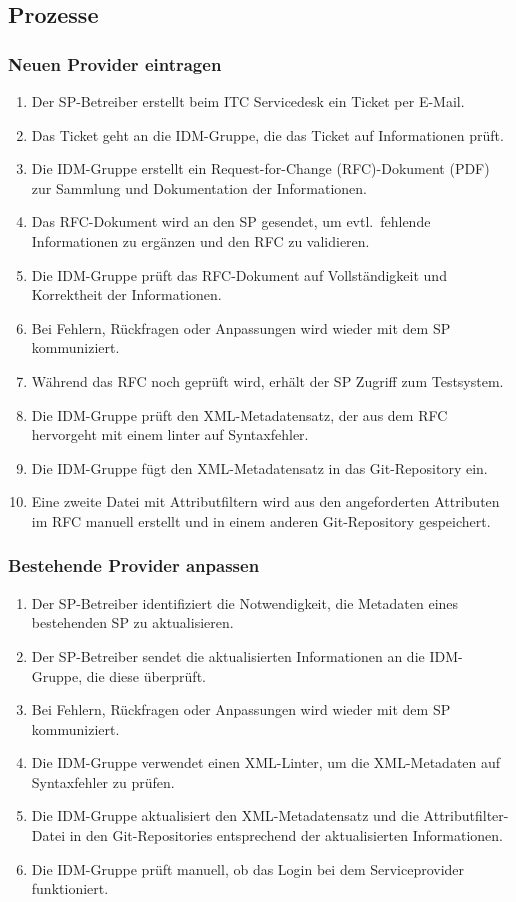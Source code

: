 \documentclass[a4paper, fontsize=11pt]{scrartcl}
\begin{document}
\subsection{Prozesse}

\subsubsection{Neuen Provider eintragen}

\begin{enumerate}
  \item Der SP-Betreiber erstellt beim ITC Servicedesk ein Ticket per E-Mail.
  \item Das Ticket geht an die IDM-Gruppe, die das Ticket auf Informationen prüft.
  \item Die IDM-Gruppe erstellt ein Request-for-Change (RFC)-Dokument (PDF) zur Sammlung und Dokumentation der Informationen.
  \item Das RFC-Dokument wird an den SP gesendet, um evtl.\ fehlende Informationen zu ergänzen und den RFC zu validieren.
  \item Die IDM-Gruppe prüft das RFC-Dokument auf Vollständigkeit und Korrektheit der Informationen.
  \item Bei Fehlern, Rückfragen oder Anpassungen wird wieder mit dem SP kommuniziert.
  \item Während das RFC noch geprüft wird, erhält der SP Zugriff zum Testsystem.
  \item Die IDM-Gruppe prüft den XML-Metadatensatz, der aus dem RFC hervorgeht mit einem linter auf Syntaxfehler.
  \item Die IDM-Gruppe fügt den XML-Metadatensatz in das Git-Repository ein.
  \item Eine zweite Datei mit Attributfiltern wird aus den angeforderten Attributen im RFC manuell erstellt und in einem anderen Git-Repository gespeichert.
\end{enumerate}

\subsubsection{Bestehende Provider anpassen}

\begin{enumerate}
  \item Der SP-Betreiber identifiziert die Notwendigkeit, die Metadaten eines bestehenden SP zu aktualisieren.
  \item Der SP-Betreiber sendet die aktualisierten Informationen an die IDM-Gruppe, die diese überprüft.
  \item Bei Fehlern, Rückfragen oder Anpassungen wird wieder mit dem SP kommuniziert.
  \item Die IDM-Gruppe verwendet einen XML-Linter, um die XML-Metadaten auf Syntaxfehler zu prüfen.
  \item Die IDM-Gruppe aktualisiert den XML-Metadatensatz und die Attributfilter-Datei in den Git-Repositories entsprechend der aktualisierten Informationen.
  \item Die IDM-Gruppe prüft manuell, ob das Login bei dem Serviceprovider funktioniert.
\end{enumerate}
\end{document}
